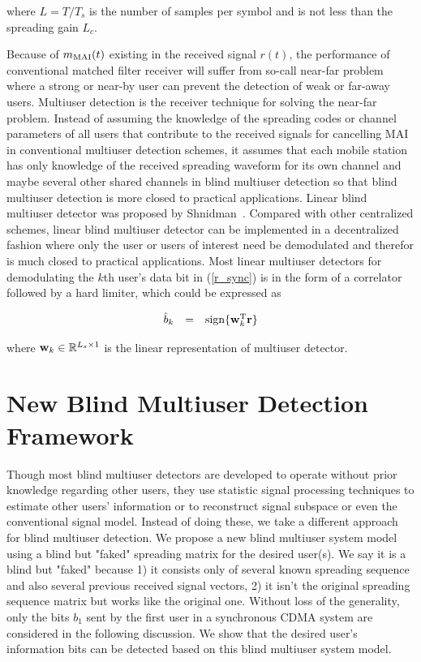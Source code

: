 \documentclass[a4paper,10pt,fleqn, twocolumn]{IEEETran}
\newcommand{\br}{{\mathbf r}}
\newcommand{\bw}{{\bf w}}
\begin{document}
\noindent where $L=T/T_s$ is the number of samples per symbol and
is not less than the spreading gain $L_c$.

Because of $m_{\rm MAI}(t)$ existing in the received signal
$r(t)$, the performance of conventional matched filter receiver
will suffer from so-call near-far problem where a strong or
near-by user can prevent the detection of weak or far-away users.
Multiuser detection is the receiver technique for solving the
near-far problem. Instead of assuming the knowledge of the
spreading codes or channel parameters of all users that contribute
to the received signals for cancelling MAI in conventional
multiuser detection schemes, it assumes that each mobile station
has only knowledge of the received spreading waveform for its own
channel and maybe several other shared channels in blind multiuser
detection so that blind multiuser detection is more closed to
practical applications. Linear blind multiuser detector was
proposed by Shnidman~\cite{Shni67}. Compared with other
centralized schemes, linear blind multiuser detector can be
implemented in a decentralized fashion where only the user or
users of interest need be demodulated and therefor is much closed
to practical applications. Most linear multiuser detectors for
demodulating the $k$th user's data bit in (\ref{r_sync}) is in the
form of a correlator followed by a hard limiter, which could be
expressed as

\begin{equation}
\begin{array}{rcl}
\hat{b}_k &=& \mbox{sign}\{\bw_k^{\rm T}\br\}
\end{array} \label{linear}
\end{equation}

\noindent where $\bw_k \in \mathbb{R}^{L_s\times 1}$ is the linear
representation of multiuser detector.

\section{New Blind Multiuser Detection Framework\label{BMUD_model}}

Though most blind multiuser detectors are developed to operate
without prior knowledge regarding other users, they use statistic
signal processing techniques to estimate other users' information
or to reconstruct signal subspace or even the conventional signal
model. Instead of doing these, we take a different approach for
blind multiuser detection. We propose a new blind multiuser system
model using a blind but "faked" spreading matrix for the desired
user(s). We say it is a blind but "faked" because 1) it consists
only of several known spreading sequence and also several previous
received signal vectors, 2) it isn't the original spreading
sequence matrix but works like the original one. Without loss of
the generality, only the bits $b_1$ sent by the first user in a
synchronous CDMA system are considered in the following
discussion. We show that the desired user's information bits can
be detected based on this blind multiuser system model.
\end{document}
